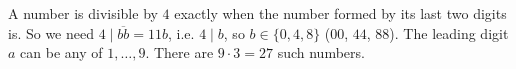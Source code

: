 A number is divisible by $4$ exactly when the number formed by its last two digits is. So we need $4\mid\overline{bb}=11b$, i.e. $4\mid b$, so $b\in\{0,4,8\}$ ($00$, $44$, $88$). The leading digit $a$ can be any of $1,\dots,9$. There are $9\cdot3=\boxed{27}$ such numbers.
